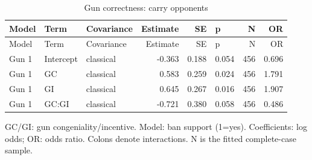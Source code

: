 
\begin{longtable}[t]{lllrrlrr}
\caption{\label{tab:logit2}Gun correctness: carry opponents}\\
\toprule
Model & Term & Covariance & Estimate & SE & p & N & OR\\
\midrule
\endfirsthead
\toprule
Model & Term & Covariance & Estimate & SE & p & N & OR\\
\midrule
\endhead
Gun 1 & Intercept & classical & -0.363 & 0.188 & 0.054 & 456 & 0.696\\
Gun 1 & GC & classical & 0.583 & 0.259 & 0.024 & 456 & 1.791\\
Gun 1 & GI & classical & 0.645 & 0.267 & 0.016 & 456 & 1.907\\
Gun 1 & GC:GI & classical & -0.721 & 0.380 & 0.058 & 456 & 0.486\\
\bottomrule
\end{longtable}
\noindent\footnotesize GC/GI: gun congeniality/incentive. Model: ban support (1=yes). Coefficients: log odds; OR: odds ratio. Colons denote interactions. N is the fitted complete-case sample.\par\normalsize
